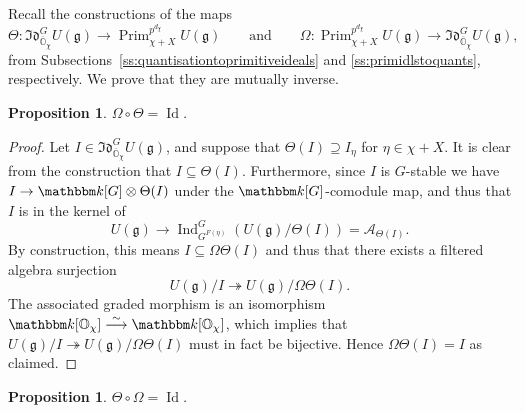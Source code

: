 \documentclass[twoside,12pt,reqno]{amsart}
\newtheorem{Proposition}[Theorem]{Proposition}
\theoremstyle{remark}
\numberwithin{equation}{section}
\def\isoto{\overset{\sim}{\longrightarrow}}
\def\k{{\mathbbm k}}
\def\Id{\operatorname{Id}}
\def\Ind{\operatorname{Ind}}
\def\Prim{\operatorname{Prim}}
\def\o{\overline}
\def\O{{\mathbb O}}
\def\g{{\mathfrak g}}
\def\Idl{\mathfrak{Id}}
\def\cA{\mathcal{A}}
\begin{document}
Recall the constructions of the maps $$\Theta:\Idl_{\o{\O}_\chi}^{G} U(\g)\to \Prim_{\chi+X}^{p^{d_\chi}} U(\g) \qquad\mbox{and}\qquad \Omega:\Prim_{\chi+X}^{p^{d_\chi}} U(\g)\to \Idl_{\o{\O}_\chi}^{G} U(\g),$$ from Subsections~\ref{ss:quantisationtoprimitiveideals} and \ref{ss:primidlstoquants}, respectively. We prove that they are mutually inverse.

\begin{Proposition}\label{P:idltoidl}
    $\Omega\circ\Theta=\Id$.
\end{Proposition}
\begin{proof}
    Let $I\in \Idl_{\o{\O}_\chi}^{G} U(\g)$, and suppose that $\Theta(I)\supseteq I_\eta$ for $\eta\in \chi+X$. It is clear from the construction that $I\subseteq \Theta(I)$. Furthermore, since $I$ is $G$-stable we have $I\to \k[G]\otimes\Theta(I)$ under the $\k[G]$-comodule map, and thus that $I$ is in the kernel of $$U(\g)\to \Ind_{G^{F(\eta)}}^{G}(U(\g)/\Theta(I))=\cA_{\Theta(I)}.$$ By construction, this means $I\subseteq \Omega\Theta(I)$ and thus that there exists a filtered algebra surjection $$U(\g)/I\twoheadrightarrow U(\g)/\Omega\Theta(I).$$ The associated graded morphism is an isomorphism $\k[\O_\chi]\isoto\k[\O_\chi]$, which implies that $U(\g)/I\twoheadrightarrow U(\g)/\Omega\Theta(I)$ must in fact be bijective. Hence $\Omega\Theta(I)=I$ as claimed.
\end{proof}

\begin{Proposition}\label{P:primtoprim}
    $\Theta\circ\Omega=\Id$.
\end{Proposition}
\end{document}
